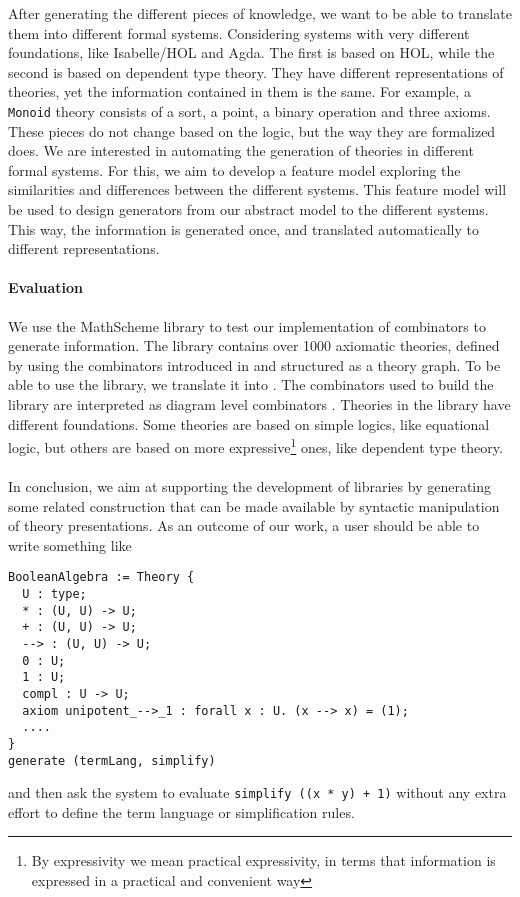 \documentclass[a4paper]{article}
\begin{document}
After generating the different pieces of knowledge, we want to be able to translate them into different 
formal systems. Considering systems with very different foundations, like Isabelle/HOL and Agda. 
The first 
is based on HOL, while the second is based on dependent type theory. They have different 
representations of theories, yet the information contained in them is the same. For example, a 
\verb|Monoid| 
theory consists of a sort, a point, a binary operation and three axioms. These pieces do not change 
based on the logic, but the way they are formalized does. We are interested in automating the 
generation of theories in different formal systems. For this, we aim to develop a feature model 
exploring the similarities and differences between the different systems. This feature model will be used 
to design generators from our abstract model to the different systems. This way, the 
information is generated once, and translated automatically to different representations. 

\paragraph{Evaluation}
We use the MathScheme library \cite{carette2011mathscheme} to test our implementation of 
combinators to generate information. The library contains over 1000 axiomatic theories, defined by 
using the combinators introduced in \cite{carette2012theory} and structured as a theory graph. To be 
able to use the library, we translate it into \mmt. The combinators used to build the library are 
interpreted as diagram level combinators \cite{rabediagram}. Theories in the library have different 
foundations. Some theories are based on simple 
logics, like equational logic, but others are based on more expressive\footnote{By expressivity we 
mean practical expressivity, in terms that information is expressed in a practical and convenient way} 
ones, like dependent type theory. 

\paragraph{} In conclusion, we aim at supporting the development of libraries by generating some 
related construction that can be made available by syntactic manipulation of theory presentations. As 
an outcome of our work, a user should be able to write something like 
\begin{lstlisting}
BooleanAlgebra := Theory {
  U : type;
  * : (U, U) -> U;
  + : (U, U) -> U;
  --> : (U, U) -> U;
  0 : U;
  1 : U;
  compl : U -> U;
  axiom unipotent_-->_1 : forall x : U. (x --> x) = (1);
  ....
}
generate (termLang, simplify)
\end{lstlisting}
and then ask the system to evaluate \verb|simplify ((x * y) + 1)| without any extra effort to define the 
term language or simplification rules. 




%
\end{document}
